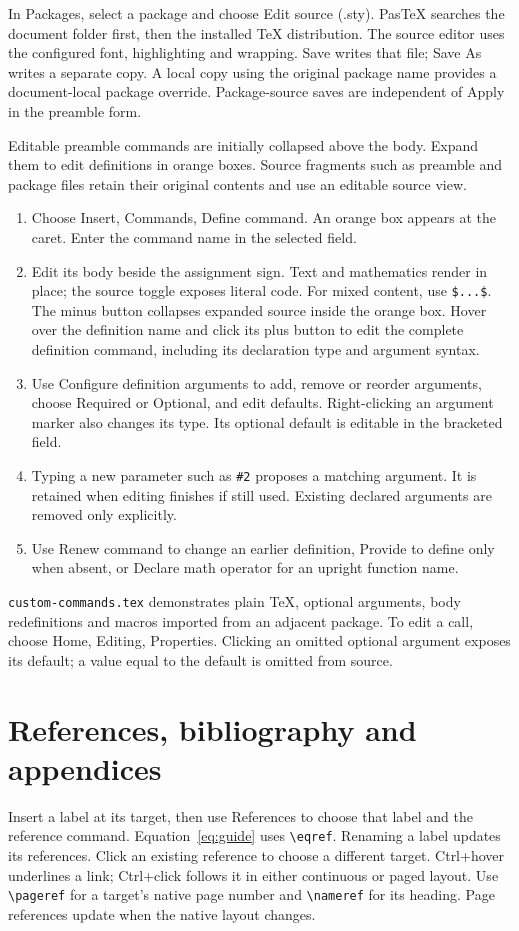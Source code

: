 \documentclass[11pt]{article}
\begin{document}
In Packages, select a package and choose Edit source (.sty). PasTeX searches the
document folder first, then the installed \TeX{} distribution. The source editor
uses the configured font, highlighting and wrapping. Save writes that file;
Save As writes a separate copy. A local copy using the original package name
provides a document-local package override. Package-source
saves are independent of Apply in the preamble form.

Editable preamble commands are initially collapsed above the body. Expand them
to edit definitions in orange boxes. Source fragments such as preamble and
package files retain their original contents and use an editable source view.

\begin{enumerate}
\item Choose Insert, Commands, Define command. An orange box appears at the caret.
Enter the command name in the selected field.
\item Edit its body beside the assignment sign. Text and mathematics render in
place; the source toggle exposes literal code. For mixed content, use \verb|$...$|.
The minus button collapses expanded source inside the orange box.
Hover over the definition name and click its plus button to edit the complete
definition command, including its declaration type and argument syntax.
\item Use Configure definition arguments to add, remove or reorder arguments,
choose Required or Optional, and edit defaults. Right-clicking an argument marker
also changes its type. Its optional default is editable in the bracketed field.
\item Typing a new parameter such as \verb|#2| proposes a matching argument.
It is retained when editing finishes if still used. Existing declared arguments
are removed only explicitly.
\item Use Renew command to change an earlier definition, Provide to define only
when absent, or Declare math operator for an upright function name.
\end{enumerate}

\texttt{custom-commands.tex} demonstrates plain \TeX{}, optional arguments,
body redefinitions and macros imported from an adjacent package. To edit a call,
choose Home, Editing, Properties. Clicking an omitted optional
argument exposes its default; a value equal to the default is omitted from source.

\section{References, bibliography and appendices}
Insert a label at its target, then use References to choose that label and the
reference command. Equation~\eqref{eq:guide} uses \verb|\eqref|. Renaming a label
updates its references. Click an existing reference to choose a different target.
Ctrl+hover underlines a link; Ctrl+click follows it in either continuous or paged layout.
Use \verb|\pageref| for a target's native page number and \verb|\nameref| for its
heading. Page references update when the native layout changes.
\end{document}
